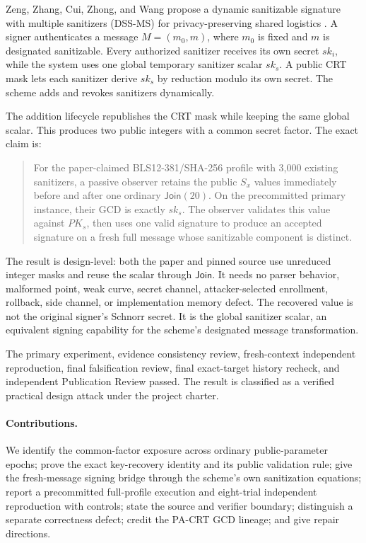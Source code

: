\documentclass[10pt,a4paper]{article}
\newcommand{\DJoin}{\mathsf{Join}}
\begin{document}
Zeng, Zhang, Cui, Zhong, and Wang propose a dynamic sanitizable signature with
multiple sanitizers (DSS-MS) for privacy-preserving shared logistics
\cite{dssms}. A signer authenticates a message
\(M=(m_0,m)\), where \(m_0\) is fixed and \(m\) is designated sanitizable.
Every authorized sanitizer receives its own secret \(sk_i\), while the system
uses one global temporary sanitizer scalar \(sk_s\). A public CRT mask lets
each sanitizer derive \(sk_s\) by reduction modulo its own secret. The scheme
adds and revokes sanitizers dynamically.

The addition lifecycle republishes the CRT mask while keeping the same global
scalar. This produces two public integers with a common secret factor. The
exact claim is:

\begin{quote}
For the paper-claimed BLS12-381/SHA-256 profile with 3,000 existing
sanitizers, a passive observer retains the public \(S_x\) values immediately
before and after one ordinary \(\DJoin(20)\). On the precommitted primary
instance, their GCD is exactly \(sk_s\). The observer validates this value
against \(PK_s\), then uses one valid signature to produce an accepted
signature on a fresh full message whose sanitizable component is distinct.
\end{quote}

The result is design-level: both the paper and pinned source use unreduced
integer masks and reuse the scalar through \(\DJoin\). It needs no parser
behavior, malformed point, weak curve, secret channel, attacker-selected
enrollment, rollback, side channel, or implementation memory defect. The
recovered value is not the original signer's Schnorr secret. It is the global
sanitizer scalar, an equivalent signing capability for the scheme's designated
message transformation.

The primary experiment, evidence consistency review, fresh-context independent
reproduction, final falsification review, final exact-target history recheck,
and independent Publication Review passed. The result is classified as a
verified practical design attack under the project charter.

\paragraph{Contributions.}
We identify the common-factor exposure across ordinary public-parameter
epochs; prove the exact key-recovery identity and its public validation rule;
give the fresh-message signing bridge through the scheme's own sanitization
equations; report a precommitted full-profile execution and eight-trial
independent reproduction with controls; state the source and verifier boundary;
distinguish a separate correctness defect; credit the PA-CRT GCD lineage; and
give repair directions.
\end{document}
